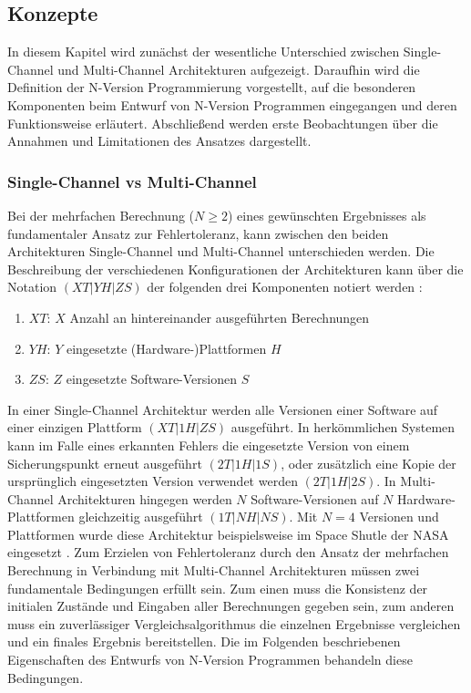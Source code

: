 \subsection{Konzepte} \label{konzepte}
%
In diesem Kapitel wird zunächst der wesentliche Unterschied zwischen Single-Channel und Multi-Channel Architekturen aufgezeigt. Daraufhin wird die Definition der N-Version Programmierung vorgestellt, auf die besonderen Komponenten beim Entwurf von N-Version Programmen eingegangen und deren Funktionsweise erläutert. Abschließend werden erste Beobachtungen über die Annahmen und Limitationen des Ansatzes dargestellt.
\subsubsection{Single-Channel vs Multi-Channel} \label{channel}
%
%
Bei der mehrfachen Berechnung ($ N \geq 2 $)  eines gewünschten Ergebnisses als fundamentaler Ansatz zur Fehlertoleranz, kann zwischen den beiden Architekturen Single-Channel und Multi-Channel unterschieden werden.
Die Beschreibung der verschiedenen Konfigurationen der Architekturen kann über die Notation $(XT|YH|ZS)$ der folgenden drei Komponenten notiert werden \cite{Avizienis:1985:NAF:1314034.1314064}:
\begin{enumerate}
	\item $XT$: $X$ Anzahl an hintereinander ausgeführten Berechnungen
	\item $YH$: $Y$ eingesetzte (Hardware-)Plattformen $H$
	\item $ZS$: $Z$ eingesetzte Software-Versionen $S$
\end{enumerate}
In einer Single-Channel Architektur werden alle Versionen einer Software auf einer einzigen Plattform $(XT|1H|ZS)$ ausgeführt. In herkömmlichen Systemen kann im Falle eines erkannten Fehlers die eingesetzte Version von einem Sicherungspunkt erneut ausgeführt $(2T|1H|1S)$, oder zusätzlich eine Kopie der ursprünglich eingesetzten Version verwendet werden $(2T|1H|2S)$.
In Multi-Channel Architekturen hingegen werden $N$ Software-Versionen auf $N$ Hardware-Plattformen gleichzeitig ausgeführt $(1T|NH|NS)$.
Mit $N=4$ Versionen und Plattformen wurde diese Architektur beispielsweise im Space Shutle der NASA eingesetzt \cite{conf/ifip/Goldberg80}.
Zum Erzielen von Fehlertoleranz durch den Ansatz der mehrfachen Berechnung in Verbindung mit Multi-Channel Architekturen müssen zwei fundamentale Bedingungen erfüllt sein. Zum einen muss die Konsistenz der initialen Zustände und Eingaben aller Berechnungen gegeben sein, zum anderen muss ein zuverlässiger Vergleichsalgorithmus die einzelnen Ergebnisse vergleichen und ein finales Ergebnis bereitstellen.
Die im Folgenden beschriebenen Eigenschaften des Entwurfs von N-Version Programmen behandeln diese Bedingungen.
%
%
